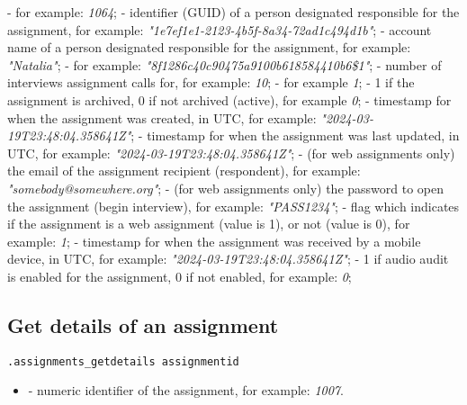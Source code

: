 \begin{compactitem}
   - for example: \textit{1064};
   - identifier (GUID) of a person designated responsible
  for the assignment, for example: \textit{"1e7ef1e1-2123-4b5f-8a34-72ad1c494d1b"};
   - account name of a person designated responsible
  for the assignment, for example: \textit{"Natalia"};
   - for example: \textit{"8f1286c40c90475a9100b618584410b6\$1"};
   - number of interviews assignment calls for, for example: \textit{10};
   - for example \textit{1};
   - 1 if the assignment is archived, 0 if not archived (active), for example \textit{0};
   - timestamp for when the assignment was created, in UTC, for example: \textit{"2024-03-19T23:48:04.358641Z"};
   - timestamp for when the assignment was last updated, in UTC, for example: \textit{"2024-03-19T23:48:04.358641Z"};
   - (for web assignments only) the email of the assignment recipient (respondent), for example: \textit{"somebody@somewhere.org"};
   - (for web assignments only) the password to open the assignment (begin interview), for example: \textit{"PASS1234"};
   - flag which indicates if the assignment is a web assignment (value is 1), or not (value is 0), for example: \textit{1};
   - timestamp for when the assignment was received by a mobile device, in UTC, for example: \textit{"2024-03-19T23:48:04.358641Z"};
   - 1 if audio audit is enabled for the assignment, 0 if not enabled, for example: \textit{0};
\end{compactitem}


\subsection{Get details of an assignment}

\begin{lstlisting}[style=CommandLineStyle]
.assignments_getdetails assignmentid
\end{lstlisting}

\paramsheader
\begin{itemize}
    \item {} - numeric identifier of the assignment, for
    example: \textit{1007}.
\end{itemize}

